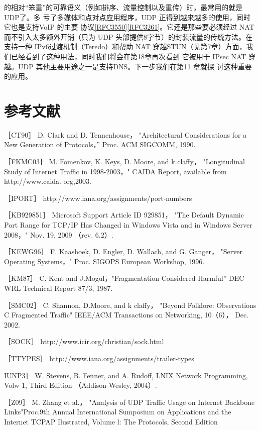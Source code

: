 的相对“笨重”的可靠语义（例如排序、流量控制以及重传）时，最常用的就是UDP了。多
亏了多媒体和点对点应用程序，UDP 正得到越来越多的使用，同时它也是支持VoIP 的主要
协议\href{https://www.rfc-editor.org/rfc/rfc3550}{[RFC3550]}\href{https://www.rfc-editor.org/rfc/rfc3261}{[RFC3261]}。它还是那些要必须经过 NAT 而不引入太多额外开销（只为 UDP
头部提供8字节）的封装流量的传统方法。在支持一种 IPv6过渡机制（Teredo）和帮助 NAT
穿越STUN（见第7章）方面，我们已经看到了这种用法，同时我们将会在第18章再次看到
它被用于 IPsec NAT 穿越。UDP 其他主要用途之一是支持DNS。下一步我们在第11 章就探
讨这种重要的应用。

\section{参考文献}
［CT90］ D. Clark and D. Tennenhouse， "Architectural Considerations for a New
Generation of Protocols，” Proc. ACM SIGCOMM, 1990.

［FKMC03］ M. Fomenkov, K. Keys, D. Moore, and k claffy， "Longitudinal Study of
Internet Traffic in 1998-2003，" CAIDA Report, available from http://www.caida.
org,2003.

［IPORT］ http://www.iana.org/assignments/port-numbers

［KB929851］ Microsoft Support Article ID 929851， "The Default Dynamic Port
Range for TCP/IP Has Changed in Windows Vista and in Windows Server 2008，"
Nov. 19, 2009 （rev. 6.2）.

［KEWG96］ F. Kaashoek, D. Engler, D. Wallach, and G. Ganger， "Server Operating
Systems，" Proc. SIGOPS European Workshop, 1996.

［KM87］ C. Kent and J.Mogul，"Fragmentation Considered Harmful” DEC WRL
Technical Report 87/3, 1987.

［SMC02］ C. Shannon, D.Moore, and k claffy， "Beyond Folklore: Observations C
Fragmented Traffic" IEEE/ACM Transactions on Networking, 10（6）， Dec. 2002.

［SOCK］ http://www.icir.org/christian/sock.html

［TTYPES］ http://www.iana.org/assignments/trailer-types

IUNP3］ W. Stevens, B. Fenner, and A. Rudoff, LNIX Network Programming, Volw
1, Third Edition （Addison-Wesley, 2004）.

［Z09］ M. Zhang et al.， "Analysis of UDP Traffic Usage on Internet Backbone
Links"Proc.9th Annual International Sumposium on Applications and the Internet
TCPAP Ilustrated, Volume l: The Protocols, Second Edition
